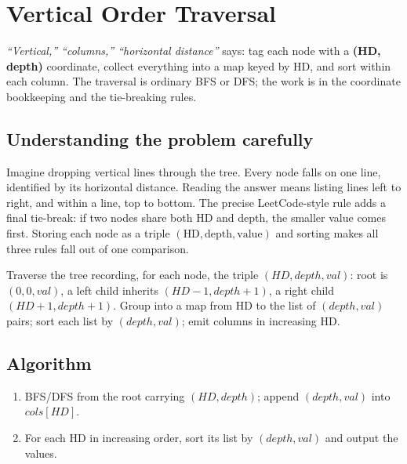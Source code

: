 \section{Vertical Order Traversal}
\label{sec:trees-vertical}


\begin{patternbox}
\emph{``Vertical,'' ``columns,'' ``horizontal distance''} says: tag each
node with a \textbf{(HD, depth)} coordinate, collect everything into a map
keyed by HD, and sort within each column. The traversal is ordinary BFS or
DFS; the work is in the coordinate bookkeeping and the tie-breaking rules.
\end{patternbox}

\subsection*{Understanding the problem carefully}

Imagine dropping vertical lines through the tree. Every node falls on one
line, identified by its horizontal distance. Reading the answer means
listing lines left to right, and within a line, top to bottom. The precise
LeetCode-style rule adds a final tie-break: if two nodes share both HD and
depth, the smaller value comes first. Storing each node as a triple
$(\text{HD},\text{depth},\text{value})$ and sorting makes all three rules
fall out of one comparison.

\begin{ideabox}
Traverse the tree recording, for each node, the triple $(HD, depth,
val)$: root is $(0,0,val)$, a left child inherits $(HD-1, depth+1)$, a
right child $(HD+1, depth+1)$. Group into a map from HD to the list of
$(depth, val)$ pairs; sort each list by $(depth, val)$; emit columns in
increasing HD.
\end{ideabox}

\subsection*{Algorithm}

\begin{enumerate}
  \item BFS/DFS from the root carrying $(HD, depth)$; append $(depth,
        val)$ into $\textit{cols}[HD]$.
  \item For each HD in increasing order, sort its list by $(depth, val)$
        and output the values.
\end{enumerate}

